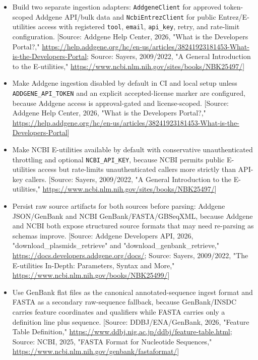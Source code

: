 \documentclass[11pt]{report}
\begin{document}
\begin{itemize}
\item Build two separate ingestion adapters: \texttt{AddgeneClient} for approved token-scoped Addgene API/bulk data and \texttt{NcbiEntrezClient} for public Entrez/E-utilities access with registered \texttt{tool}, \texttt{email}, \texttt{api\_key}, retry, and rate-limit configuration. [Source: Addgene Help Center, 2026, "What is the Developers Portal?," \url{https://help.addgene.org/hc/en-us/articles/38241923181453-What-is-the-Developers-Portal}; Source: Sayers, 2009/2022, "A General Introduction to the E-utilities," \url{https://www.ncbi.nlm.nih.gov/sites/books/NBK25497/}]
\item Make Addgene ingestion disabled by default in CI and local setup unless \texttt{ADDGENE\_API\_TOKEN} and an explicit accepted-license marker are configured, because Addgene access is approval-gated and license-scoped. [Source: Addgene Help Center, 2026, "What is the Developers Portal?," \url{https://help.addgene.org/hc/en-us/articles/38241923181453-What-is-the-Developers-Portal}]
\item Make NCBI E-utilities available by default with conservative unauthenticated throttling and optional \texttt{NCBI\_API\_KEY}, because NCBI permits public E-utilities access but rate-limits unauthenticated callers more strictly than API-key callers. [Source: Sayers, 2009/2022, "A General Introduction to the E-utilities," \url{https://www.ncbi.nlm.nih.gov/sites/books/NBK25497/}]
\item Persist raw source artifacts for both sources before parsing: Addgene JSON/GenBank and NCBI GenBank/FASTA/GBSeqXML, because Addgene and NCBI both expose structured source formats that may need re-parsing as schemas improve. [Source: Addgene Developers API, 2026, "download\_plasmids\_retrieve" and "download\_genbank\_retrieve," \url{https://docs.developers.addgene.org/docs/}; Source: Sayers, 2009/2022, "The E-utilities In-Depth: Parameters, Syntax and More," \url{https://www.ncbi.nlm.nih.gov/books/NBK25499/}]
\item Use GenBank flat files as the canonical annotated-sequence ingest format and FASTA as a secondary raw-sequence fallback, because GenBank/INSDC carries feature coordinates and qualifiers while FASTA carries only a definition line plus sequence. [Source: DDBJ/ENA/GenBank, 2026, "Feature Table Definition," \url{https://www.ddbj.nig.ac.jp/ddbj/feature-table.html}; Source: NCBI, 2025, "FASTA Format for Nucleotide Sequences," \url{https://www.ncbi.nlm.nih.gov/genbank/fastaformat/}]

\end{itemize}
\end{document}
